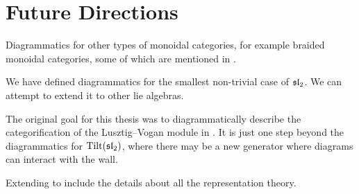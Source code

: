 \chapter{Future Directions}
\label{chapter:future-directions}


Diagrammatics for other types of monoidal categories, for example braided monoidal categories, some of which are mentioned in \cite{selinger-survey-of-graphical-monoidal-categories}.

We have defined diagrammatics for the smallest non-trivial case of $\operatorname{\mathfrak{sl}}_2$. We can attempt to extend it to other lie algebras.

The original goal for this thesis was to diagrammatically describe the categorification of the Lusztig--Vogan module in \cite{categorification-lusztig-vogan-module}. It is just one step beyond the diagrammatics for $\operatorname{Tilt}(\operatorname{\mathfrak{sl}}_2)$, where there may be a new generator where diagrams can interact with the wall.

Extending to include the details about all the representation theory.
